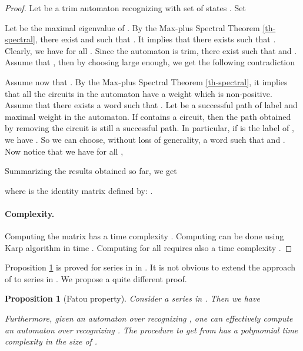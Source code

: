 \documentclass{article}
\newtheorem{prpstn}[thrm]{Proposition}
\newcommand{\1}{\mathbb{1}}
\newcommand{\0}{\mathbb{0}}
\begin{document}
\begin{proof}
Let  be a trim automaton recognizing  with
set of states . Set 

Let  be the maximal eigenvalue of . 
By the Max-plus Spectral Theorem \ref{th-spectral}, there exist
 and  such that . 
It implies that there exists  such that 
. 
Clearly, we have  for all . 
Since the automaton is 
trim, there exist  such that  and  .  
Assume that , then 
by choosing  large enough, we get the following contradiction

Assume now that . By the Max-plus Spectral Theorem
\ref{th-spectral}, 
it implies that all the circuits in the automaton have a weight which
is non-positive. 
Assume that there exists a word  such
that . Let  be a successful path of label  and 
maximal weight in the automaton. If  contains a circuit, then 
the path  obtained by removing the circuit is still a successful
path. In particular, if  is the label of ,
we have . 
So we can choose, without loss of generality, a word  such that
 and . 
Now notice that we have for all ,

Summarizing the results obtained so far, we get

where  is the identity matrix defined by: . 

\paragraph{Complexity.}
Computing the matrix  has a time complexity . 
Computing  can be done using Karp algorithm \cite[Theorem
2.19]{BCOQ} in 
time . Computing  for all  requires also a time complexity . 
\end{proof}














Proposition \ref{pr-fatou} is proved for series in
 in \cite[Proposition 4.2]{krob94}. It is not obvious to
extend the approach of \cite{krob94} to series in
. We propose a quite different proof. 

\begin{prpstn}[Fatou property]\label{pr-fatou}
Consider a series  in . Then we have

Furthermore, given an automaton  over  recognizing
, one can effectively compute an automaton  over 
recognizing . The procedure to get  from  has a
polynomial time complexity in the size of . 
\end{prpstn}
\end{document}
